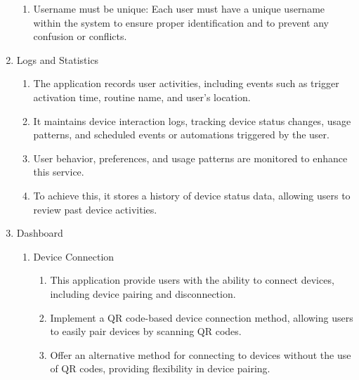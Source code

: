 \begin{enumerate}[label=\arabic*.]
\begin{enumerate}[label*={\arabic*.},ref=\theenumi.\arabic*]
              \item Username must be unique: Each user must have a unique username within the system to ensure proper identification and to prevent any confusion or conflicts.\\
          \end{enumerate}

    \item {\large{Logs and Statistics}}\\
          \begin{enumerate}[label*={\arabic*.},ref=\theenumi.\arabic*]
              \setlength{\itemindent}{0.5cm}
              \item The application records user activities, including events such as trigger activation time, routine name, and user's location. \\

              \item It maintains device interaction logs, tracking device status changes, usage patterns, and scheduled events or automations triggered by the user. \\


              \item User behavior, preferences, and usage patterns are monitored to enhance this service. \\

              \item To achieve this, it stores a history of device status data, allowing users to review past device activities.\\
          \end{enumerate}


    \item {\large{Dashboard}}\\
          \begin{enumerate}[label*={\arabic*.}]
              \item {\large{Device Connection}}\\
                    \begin{enumerate}[label*={\arabic*.},ref=\theenumi.\arabic*]
                        \setlength{\itemindent}{0.5cm}
                        \item This application provide users with the ability to connect devices, including device pairing and disconnection.\\
                        \item Implement a QR code-based device connection method, allowing users to easily pair devices by scanning QR codes.\\
                        \item Offer an alternative method for connecting to devices without the use of QR codes, providing flexibility in device pairing.\\
                    \end{enumerate}


\end{enumerate}
\end{enumerate}

